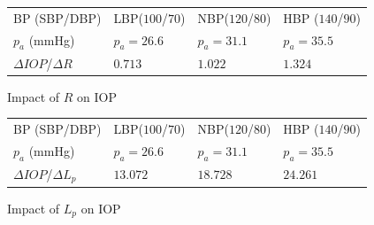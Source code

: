 \begin{figure}[h]
\begin{tabular}{|l|l|l|l|}
\hline
BP (SBP/DBP)& LBP($100$/$70$)&NBP($120$/$80$) & HBP ($140$/$90$)\\
$p_a$ (mmHg)& $p_a = 26.6$ & $p_a = 31.1$ & $p_a = 35.5$\\
\hline
$\Delta IOP$/$\Delta R $& $0.713$ & $1.022$ & $1.324$\\
\hline
\end{tabular}
\caption{Impact of $R$ on IOP}
\end{figure}
\begin{figure}[h]
\begin{tabular}{|l|l|l|l|}
\hline
BP (SBP/DBP)& LBP($100$/$70$)&NBP($120$/$80$) & HBP ($140$/$90$)\\
$p_a$ (mmHg)& $p_a = 26.6$ & $p_a = 31.1$ & $p_a = 35.5$\\
\hline
$\Delta IOP$/$\Delta L_p $& $13.072$ & $18.728$ & $24.261$\\
\hline
\end{tabular}
\caption{Impact of $L_p$ on IOP}
\end{figure}
